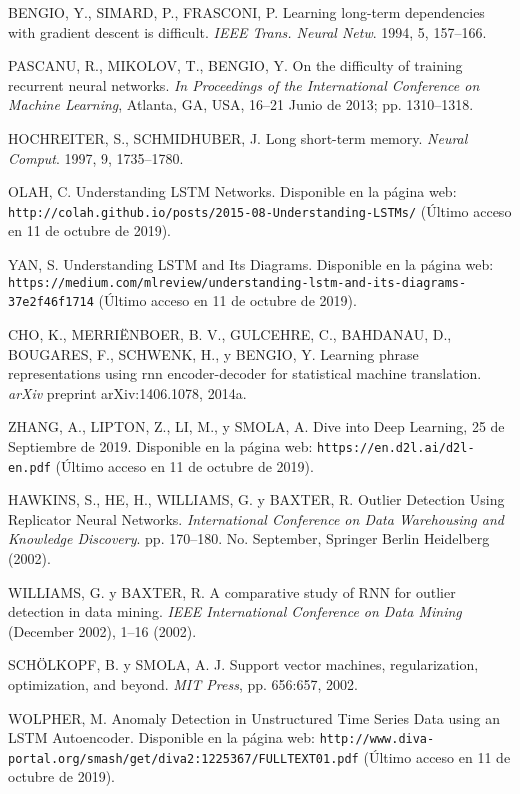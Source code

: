 \begin{thebibliography}{9}
 BENGIO, Y., SIMARD, P., FRASCONI, P. Learning long-term dependencies with gradient descent is difficult. \textit{IEEE Trans. Neural Netw}. 1994, 5, 157–166.

 PASCANU, R., MIKOLOV, T., BENGIO, Y. On the difficulty of training recurrent neural networks. \textit{In Proceedings of the International Conference on Machine Learning}, Atlanta, GA, USA, 16–21 Junio de 2013; pp. 1310–1318.

 HOCHREITER, S., SCHMIDHUBER, J. Long short-term memory. \textit{Neural Comput}. 1997, 9, 1735–1780.

 OLAH, C. Understanding LSTM Networks. Disponible en la p\'{a}gina web: \texttt{http://colah.github.io/posts/2015-08-Understanding-LSTMs/} (\'{U}ltimo acceso en 11 de octubre de 2019).

 YAN, S. Understanding LSTM and Its Diagrams. Disponible en la p\'{a}gina web: \texttt{https://medium.com/mlreview/understanding-lstm-and-its-diagrams-37e2f46f1714} (\'{U}ltimo acceso en 11 de octubre de 2019).

 CHO, K., MERRI\"{E}NBOER, B. V., GULCEHRE, C., BAHDANAU, D., BOUGARES, F., SCHWENK, H., y BENGIO, Y. Learning phrase representations using rnn encoder-decoder for statistical machine translation. \textit{arXiv} preprint arXiv:1406.1078, 2014a.

 ZHANG, A., LIPTON, Z., LI, M., y SMOLA, A. Dive into Deep Learning, 25 de Septiembre de 2019. Disponible en la p\'{a}gina web: \texttt{https://en.d2l.ai/d2l-en.pdf} (\'{U}ltimo acceso en 11 de octubre de 2019).

 HAWKINS, S., HE, H., WILLIAMS, G. y BAXTER, R. Outlier Detection Using Replicator Neural Networks. \textit{International Conference on Data Warehousing and Knowledge Discovery}. pp. 170–180. No. September, Springer Berlin Heidelberg (2002).

  WILLIAMS, G. y BAXTER, R. A comparative study of RNN for outlier detection in data mining. \textit{IEEE International Conference on Data Mining} (December 2002), 1–16 (2002).

 SCH\"{O}LKOPF, B. y SMOLA, A. J. Support vector machines, regularization, optimization, and beyond. \textit{MIT Press}, pp. 656:657, 2002.

 WOLPHER, M. Anomaly Detection in Unstructured Time Series Data using an LSTM Autoencoder. Disponible en la p\'{a}gina web: \texttt{http://www.diva-portal.org/smash/get/diva2:1225367/FULLTEXT01.pdf} (\'{U}ltimo acceso en 11 de octubre de 2019).


\end{thebibliography} 
